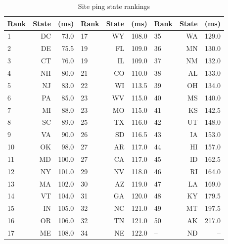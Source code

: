 \begin{table}[h]
    \centering
    \begin{tabular}{lrr|lrr|lrr}
    \textbf{Rank} & \textbf{State} & \textbf{(ms)} & \textbf{Rank} & \textbf{State} & \textbf{(ms)} & \textbf{Rank} &  \textbf{State} & \textbf{(ms)} \\
    \hline
    1  & DC    &    73.0 &     17     &  WY    &   108.0 &    35 &     WA    &   129.0 \\
    2  & DE    &    75.5 &     19     &  FL    &   109.0 &    36 &     MN    &   130.0 \\
    3  & CT    &    76.0 &     19     &  IL    &   109.0 &    37 &     NM    &   132.0 \\
    4  & NH    &    80.0 &     21     &  CO    &   110.0 &    38 &     AL    &   133.0 \\
    5  & NJ    &    83.0 &     22     &  WI    &   113.5 &    39 &     OH    &   134.0 \\
    6  & PA    &    85.0 &     23     &  WV    &   115.0 &    40 &     MS    &   140.0 \\
    7  & MI    &    88.0 &     23     &  MO    &   115.0 &    41 &     KS    &   142.5 \\
    8  & SC    &    89.0 &     25     &  TX    &   116.0 &    42 &     UT    &   148.0 \\
    9  & VA    &    90.0 &     26     &  SD    &   116.5 &    43 &     IA    &   153.0 \\
    10 & OK    &    98.0 &    27     &  AR    &   117.0 &    44 &     HI    &   157.0 \\
    11 & MD    &   100.0 &    27     &  CA    &   117.0 &    45 &     ID    &   162.5 \\
    12 & NY    &   101.0 &    29     &  NV    &   118.0 &    46 &     RI    &   164.0 \\
    13 & MA    &   102.0 &    30     &  AZ    &   119.0 &    47 &     LA    &   169.0 \\
    14 & VT    &   104.0 &    31     &  GA    &   120.0 &    48 &     KY    &   179.5 \\
    15 & IN    &   105.0 &    32     &  NC    &   121.0 &    49 &     MT    &   197.5 \\
    16 & OR    &   106.0 &    32     &  TN    &   121.0 &    50 &     AK    &   217.0 \\
    17 & ME    &   108.0 &    34     &  NE    &   122.0 &    -- &     ND    &      -- \\
    \end{tabular}
    \caption{Site ping state rankings}
    \label{tab:site_ping_state_rankings}
\end{table}
